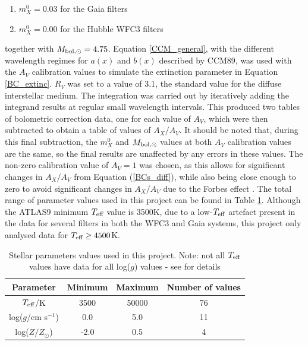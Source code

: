 \documentclass[12pt, a4paper]{report}
\begin{document}
\begin{enumerate}
\item $m_{X}^{0} = 0.03$ for the Gaia filters
\item $m_{X}^{0} = 0.00$ for the Hubble WFC3 filters
\end{enumerate}

together with $M_{\textnormal{bol},\odot} = 4.75$. Equation \ref{CCM_general}, with the different wavelength regimes for $a(x)$ and $b(x)$ described by CCM89, was used with the $A_{V}$ calibration values to simulate the extinction parameter in Equation \ref{BC_extinc}. $R_{V}$ was set to a value of 3.1, the standard value for the diffuse interstellar medium. The integration was carried out by iteratively adding the integrand results at regular small wavelength intervals. This produced two tables of bolometric correction data, one for each value of $A_{V}$, which were then subtracted to obtain a table of values of $A_{X}/A_{V}$. It should be noted that, during this final subtraction, the $m_{X}^{0}$ and $M_{\textnormal{bol},\odot}$ values at both $A_{V}$ calibration values are the same, so the final results are unaffected by any errors in these values. The non-zero calibration value of $A_{V} = 1$ was chosen, as this allows for significant changes in $A_{X}/A_{V}$ from Equation (\ref{BCs_diff}), while also being close enough to zero to avoid significant changes in $A_{X}/A_{V}$ due to the Forbes effect \citep{2008PASP..120..583G}. The total range of parameter values used in this project can be found in Table \ref{param_range_table}. Although the ATLAS9 minimum $T_{\textnormal{eff}}$ value is 3500K, due to a low-$T_{\textnormal{eff}}$ artefact present in the data for several filters in both the WFC3 and Gaia systems, this project only analysed data for $T_{\textnormal{eff}} \geq 4500$K. 

\begin{table}
\begin{center}
\begin{tabular}{cccc}
\hline
Parameter & Minimum & Maximum & Number of values\\
\hline
$T_{\textnormal{eff}}$/K & 3500 & 50000 & 76 \\
log($g$/cm s$^{-1}$) & 0.0 & 5.0 & 11 \\
log($Z/Z_{\odot}$) & -2.0 & 0.5 & 4 \\
\hline

\end{tabular}
\caption{Stellar parameters values used in this project. Note: not all $T_{\textnormal{eff}}$ values have data for all log($g$) values - see \cite{2004astro.ph..5087C} for details}
\label{param_range_table}
\end{center}
\end{table}
\end{document}
